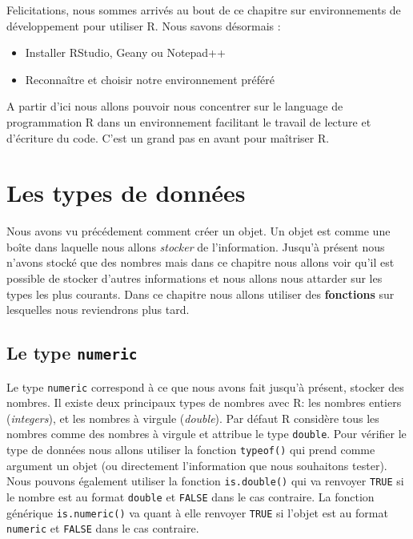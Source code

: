 \documentclass[]{book}
\providecommand{\tightlist}{%
  \setlength{\itemsep}{0pt}\setlength{\parskip}{0pt}}
\theoremstyle{definition}
\theoremstyle{definition}
\theoremstyle{definition}
\theoremstyle{remark}
\begin{document}
Felicitations, nous sommes arrivés au bout de ce chapitre sur
environnements de développement pour utiliser R. Nous savons désormais :

\begin{itemize}
\tightlist
\item
  Installer RStudio, Geany ou Notepad++
\item
  Reconnaître et choisir notre environnement préféré
\end{itemize}

A partir d'ici nous allons pouvoir nous concentrer sur le language de
programmation R dans un environnement facilitant le travail de lecture
et d'écriture du code. C'est un grand pas en avant pour maîtriser R.

\hypertarget{dataType1}{\chapter{Les types de données}\label{dataType1}}

Nous avons vu précédement comment créer un objet. Un objet est comme une
boîte dans laquelle nous allons \emph{stocker} de l'information. Jusqu'à
présent nous n'avons stocké que des nombres mais dans ce chapitre nous
allons voir qu'il est possible de stocker d'autres informations et nous
allons nous attarder sur les types les plus courants. Dans ce chapitre
nous allons utiliser des \textbf{fonctions} sur lesquelles nous
reviendrons plus tard.

\section{\texorpdfstring{Le type
\texttt{numeric}}{Le type numeric}}\label{le-type-numeric}

Le type \texttt{numeric} correspond à ce que nous avons fait jusqu'à
présent, stocker des nombres. Il existe deux principaux types de nombres
avec R: les nombres entiers (\emph{integers}), et les nombres à virgule
(\emph{double}). Par défaut R considère tous les nombres comme des
nombres à virgule et attribue le type \texttt{double}. Pour vérifier le
type de données nous allons utiliser la fonction \texttt{typeof()} qui
prend comme argument un objet (ou directement l'information que nous
souhaitons tester). Nous pouvons également utiliser la fonction
\texttt{is.double()} qui va renvoyer \texttt{TRUE} si le nombre est au
format \texttt{double} et \texttt{FALSE} dans le cas contraire. La
fonction générique \texttt{is.numeric()} va quant à elle renvoyer
\texttt{TRUE} si l'objet est au format \texttt{numeric} et
\texttt{FALSE} dans le cas contraire.
\end{document}
